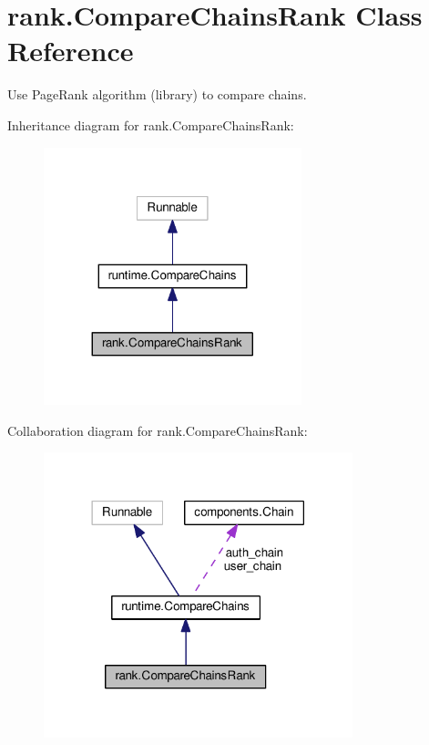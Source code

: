 \hypertarget{classrank_1_1_compare_chains_rank}{}\section{rank.\+Compare\+Chains\+Rank Class Reference}
\label{classrank_1_1_compare_chains_rank}


Use Page\+Rank algorithm (library) to compare chains.  




Inheritance diagram for rank.\+Compare\+Chains\+Rank\+:
\nopagebreak
\begin{figure}[H]
\begin{center}
\leavevmode
\includegraphics[width=212pt]{classrank_1_1_compare_chains_rank__inherit__graph}
\end{center}
\end{figure}


Collaboration diagram for rank.\+Compare\+Chains\+Rank\+:
\nopagebreak
\begin{figure}[H]
\begin{center}
\leavevmode
\includegraphics[width=254pt]{classrank_1_1_compare_chains_rank__coll__graph}
\end{center}
\end{figure}
